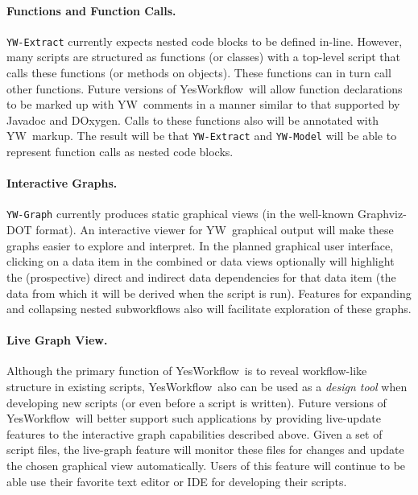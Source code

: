\documentclass{article}
\newcommand{\YW}{\textsf{YesWorkflow}}
\newcommand{\yw}{\textsf{YW}}
\newcommand{\ywm}[1]{\texttt{#1}}
\begin{document}
\paragraph{Functions and Function Calls.}
\ywm{YW-Extract} currently expects nested code blocks to be defined
in-line. However, many scripts are structured as functions (or
classes) with a top-level script that calls these functions (or
methods on objects). These functions can in turn call other functions.
%
Future versions of \YW\ will allow function declarations to be marked
up with \yw\ comments in a manner similar to that supported by Javadoc and
DOxygen. Calls to these functions also will be annotated with \yw\
markup. The result will be that \ywm{YW-Extract} and \ywm{YW-Model}
will be able to represent function calls as nested code blocks.

\paragraph{Interactive Graphs.}
\ywm{YW-Graph} currently produces static graphical views (in the
well-known Graphviz-DOT format). 
An interactive viewer for \yw\ graphical
output will make these graphs easier to explore and interpret. In the planned
graphical user interface, clicking on a data item in the combined or
data views optionally will highlight the (prospective) direct and
indirect data dependencies for that data item (the data from which it
will be derived when the script is run).  Features for expanding and
collapsing nested subworkflows also will facilitate exploration of
these graphs.

\paragraph{Live Graph View.}
Although the primary function of \YW\ is to reveal workflow-like
structure in existing scripts, \YW\ also can be used as a \emph{design
  tool} when developing new scripts (or even before a script is
written). Future versions of \YW\ will better support such
applications by providing live-update features to the interactive
graph capabilities described above. Given a set of script files, the
live-graph feature will monitor these files for changes and update the
chosen graphical view automatically. Users of this feature will
continue to be able use their favorite text editor or IDE for
developing their scripts.
\end{document}
